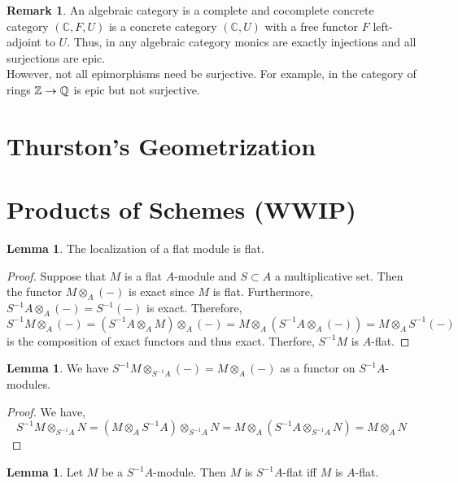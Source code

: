 \documentclass[12pt]{extarticle}
\newcommand{\Z}{\mathbb{Z}}
\theoremstyle{definition}
\newtheorem{lemma}[theorem]{Lemma}
\newtheorem{remark}{Remark}
\newcommand{\C}{\mathbb{C}}
\begin{document}
\begin{remark}
An algebraic category is a complete and cocomplete concrete category $(\C, F, U)$ is a concrete category $(\C, U)$ with a free functor $F$ left-adjoint to $U$. Thus, in any algebraic category monics are exactly injections and all surjections are epic.
\bigskip\\
However, not all epimorphisms need be surjective. For example, in the category of rings $\Z \to \Q$ is epic but not surjective. 
\end{remark}

\section{Thurston's Geometrization}

\section{Products of Schemes (WWIP)}

\newcommand{\Ass}[2]{\mathrm{Ass}_{#1} \left( #2 \right)}

\begin{lemma}
The localization of a flat module is flat.
\end{lemma}

\begin{proof}
Suppose that $M$ is a flat $A$-module and $S \subset A$ a multiplicative set. Then the functor $M \otimes_A (-)$ is exact since $M$ is flat. Furthermore, $S^{-1} A \otimes_A (-) = S^{-1}(-)$ is exact. Therefore,
\[ S^{-1} M \otimes_A (-) = (S^{-1} A \otimes_A M) \otimes_A (-) = M \otimes_A (S^{-1} A \otimes_A (-)) = M \otimes_A S^{-1}(-) \]
is the composition of exact functors and thus exact. Therfore, $S^{-1} M$ is $A$-flat. 
\end{proof}

\begin{lemma}
We have $S^{-1} M \otimes_{S^{-1} A} (-) = M \otimes_A (-)$ as a functor on $S^{-1}A$-modules. 
\end{lemma}

\begin{proof}
We have,
\[ S^{-1} M \otimes_{S^{-1} A} N = (M \otimes_A S^{-1}A) \otimes_{S^{-1} A} N = M \otimes_A (S^{-1} A \otimes_{S^{-1} A} N) = M \otimes_A N \]
\end{proof}

\begin{lemma}
Let $M$ be a $S^{-1}A$-module. Then $M$ is $S^{-1} A$-flat iff $M$ is $A$-flat.
\end{lemma}
\end{document}
